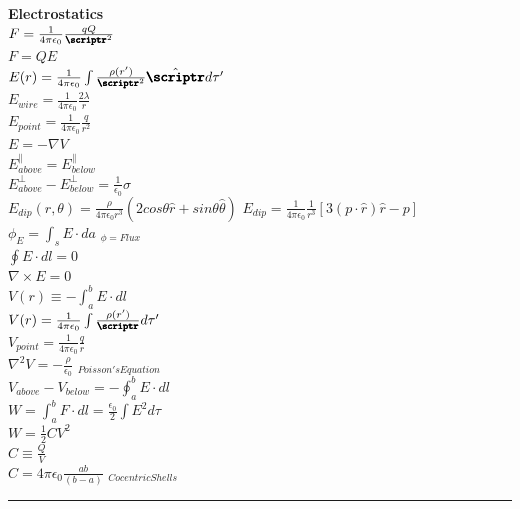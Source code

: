 \documentclass[1pt]{report}
\begin{document}
\begin{multicols}{3}
\begin{flushleft}
\textbf{Electrostatics}\\
$F=\frac{1}{4\pi\epsilon_0}\frac{qQ}{\pmb{\scriptr}^2}$\\
$F=QE$\\
$E(r)=\frac{1}{4\pi\epsilon_0}\int\frac{\rho(r')}{\pmb{\scriptr}^2}\hat{\pmb{\scriptr}}d\tau'$\\
$E_{wire}=\frac{1}{4\pi\epsilon_0}\frac{2\lambda}{r}$\\
$E_{point}=\frac{1}{4\pi\epsilon_0}\frac{q}{r^2}$\\
$E=-\nabla V$\\
$E^{\parallel}_{above}=E^{\parallel}_{below}$\\
$E^{\perp}_{above}-E^{\perp}_{below}=\frac{1}{\epsilon_0}\sigma$\\
$E_{dip}(r,\theta)=\frac{\rho}{4\pi\epsilon_0r^3}(2cos\theta\hat{r}+sin\theta\hat{\theta})$
$E_{dip}=\frac{1}{4\pi\epsilon_0}\frac{1}{r^3}[3(p\cdot\hat{r})\hat{r}-p]$\\
$\phi_E=\int_s E\cdot da$ $_{\phi=Flux}$\\
$\oint E\cdot dl=0$\\
$\nabla\times E=0$\\
$V(r)\equiv-\int_a^b E\cdot dl$\\
$V(r)=\frac{1}{4\pi\epsilon_0}\int\frac{\rho(r')}{\pmb{\scriptr}}d\tau'$\\
$V_{point}=\frac{1}{4\pi\epsilon_0}\frac{q}{r}$\\
$\nabla^2V=-\frac{\rho}{\epsilon_0}$ $_{Poisson'sEquation}$\\
$V_{above}-V_{below}=-\oint_a^b E\cdot dl$\\
$W=\int_a^b F\cdot dl=\frac{\epsilon_0}{2}\int E^2 d\tau$\\
$W=\frac{1}{2}CV^2$\\
$C\equiv\frac{Q}{V}$\\
$C=4\pi\epsilon_0\frac{ab}{(b-a)}$ $_{CocentricShells}$\\

\noindent\rule[0.5ex]{\linewidth}{1pt}


\end{flushleft}
\end{multicols}
\end{document}
